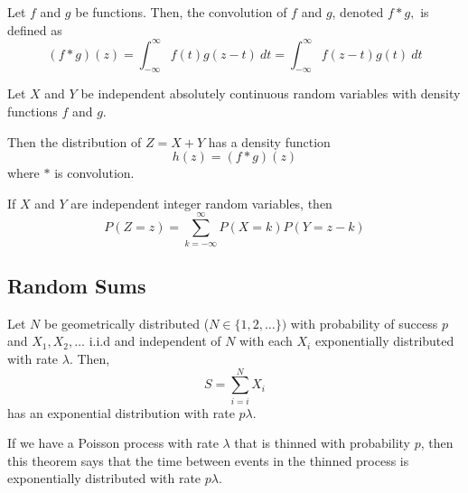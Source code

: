 \begin{defn}[Convolution]
Let $f$ and $g$ be functions. Then, the convolution of $f$ and $g$, denoted $f * g,$ is defined as
$$
(f * g)(z) = \int_{-\infty}^\infty f(t) g(z - t)~dt =  \int_{-\infty}^\infty f(z - t) g(t)~dt
$$
\end{defn}

\begin{theorem}
Let $X$ and $Y$ be independent absolutely continuous random variables with density functions $f$ and $g$.

Then the distribution of $Z = X + Y$ has a density function
$$
h(z) = (f * g)(z)
$$
where $*$ is convolution.

If $X$ and $Y$ are independent integer random variables, then
$$
P(Z = z) = \sum_{k = -\infty}^\infty P(X = k) P(Y = z - k)
$$
\end{theorem}



\subsection{Random Sums}

\begin{theorem} \label{thm:geom_sum_exp}
Let $N$ be geometrically distributed ($N \in \{1,2,\ldots\})$ with probability of success $p$ and $X_1,X_2,\ldots$ i.i.d and independent of $N$ with each $X_i$ exponentially distributed with rate $\lambda$.
Then,
$$
S = \sum_{i = i}^N X_i
$$
has an exponential distribution with rate $p \lambda$.
\end{theorem}

\begin{remark}
If we have a Poisson process with rate $\lambda$ that is thinned with probability $p$, then this theorem says that the time between events in the thinned process is exponentially distributed with rate $p \lambda$.
\end{remark}

